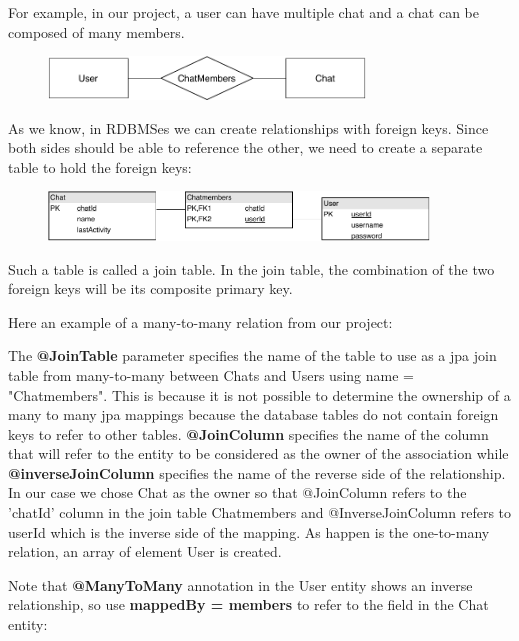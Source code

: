 \documentclass[a4paper]{article}
\begin{document}
For example, in our project, a user can have multiple chat and a chat can be composed of many members.

\begin{figure}[h]
\centering
\includegraphics[width=0.75\textwidth]{dia1.pdf}
\end{figure}

As we know, in RDBMSes we can create relationships with foreign keys. Since both sides should be able to reference the other, we need to create a separate table to hold the foreign keys:

\begin{figure}[h]
\centering
\includegraphics[width=0.90\textwidth]{dia2.pdf}
\end{figure}

Such a table is called a join table. In the join table, the combination of the two foreign keys will be its composite primary key.

Here an example of a many-to-many relation from our project:


The \textbf{@JoinTable} parameter specifies the name of the table to use as a jpa join table from many-to-many between Chats and Users using name = "Chatmembers". This is because it is not possible to determine the ownership of a many to many jpa mappings because the database tables do not contain foreign keys to refer to other tables. \textbf{@JoinColumn} specifies the name of the column that will refer to the entity to be considered as the owner of the association while \textbf{@inverseJoinColumn} specifies the name of the reverse side of the relationship. In our case we chose Chat as the owner so that @JoinColumn refers to the 'chatId' column in the join table Chatmembers and @InverseJoinColumn refers to userId which is the inverse side of the mapping. As happen is the one-to-many relation, an array of element User is created.

Note that \textbf{@ManyToMany} annotation in the User entity shows an inverse relationship, so use \textbf{mappedBy = members} to refer to the field in the Chat entity:

\end{document}
